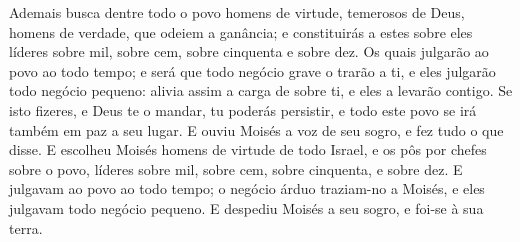 {Ademais busca dentre todo o povo homens de virtude, temerosos de Deus, homens de verdade, que odeiem a ganância; e constituirás a estes sobre eles líderes sobre mil, sobre cem, sobre cinquenta e sobre dez.
Os quais julgarão ao povo ao todo tempo; e será que todo negócio grave o trarão a ti, e eles julgarão todo negócio pequeno: alivia assim a carga de sobre ti, e eles a levarão contigo.
Se isto fizeres, e Deus te o mandar, tu poderás persistir, e todo este povo se irá também em paz a seu lugar.
E ouviu Moisés a voz de seu sogro, e fez tudo o que disse.
E escolheu Moisés homens de virtude de todo Israel, e os pôs por chefes sobre o povo, líderes sobre mil, sobre cem, sobre cinquenta, e sobre dez.
E julgavam ao povo ao todo tempo; o negócio árduo traziam-no a Moisés, e eles julgavam todo negócio pequeno.
E despediu Moisés a seu sogro, e foi-se à sua terra.

}
